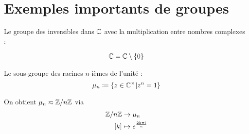 \documentclass[french,a4paper,10pt]{article}
\begin{document}
	\section{Exemples importants de groupes}
	\begin{myexample}
		Le groupe des inversibles dans $\mathbb{C}$ avec la multiplication entre nombres complexes :
		
		\[\begin{aligned}
			\mathbb{C}=\mathbb{C} \setminus \{0\}
		\end{aligned}\]
		
		Le sous-groupe des racines $n$-ièmes de l'unité :
		\[\begin{aligned}
			\mu_n\coloneq\{z\in\mathbb{C}^\times | z^n=1\}
		\end{aligned}\]
		
		\begin{myremark}
			On obtient $\mu_n \eqsim \mathbb{Z}/n\mathbb{Z}$ via
			\[\begin{aligned}
				\mathbb{Z}/n\mathbb{Z}&\to \mu_n\\
				[k]&\mapsto e^{\frac{2k\pi i}n}
			\end{aligned}\]
		\end{myremark}
		
	\end{myexample}
\end{document}
